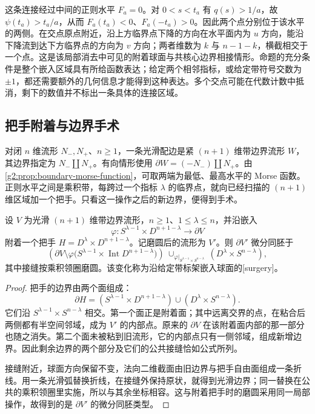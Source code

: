 \ProseParagraphBreak

这条连接经过中间的正则水平 \(F_a=0\)。对 \(0<s<t_a\) 有 \(q(s)>1/a\)，故 \(\psi(t_a)>t_a/a\)，从而 \(F_a(t_a)<0\)、\(F_a(-t_a)>0\)。因此两个点分别位于该水平的两侧。在交点原点附近，沿上方临界点下降的方向在水平面内为 \(u\) 方向，能沿下降流到达下方临界点的方向为 \(v\) 方向；两者维数为 \(k\) 与 \(n-1-k\)，横截相交于一个点。这是该局部消去中可见的附着球面与共核心边界相接情形。命题的充分条件是整个嵌入区域具有所给函数表达；给定两个相邻指标，或给定带符号交数为 \(\pm1\)，都还需要额外的几何信息才能得到这种表达。多个交点可能在代数计数中抵消，剩下的数值并不标出一条具体的连接区域。

\subsection{把手附着与边界手术}
\label{g2:subsec:1705:03}

对闭 \(n\) 维流形 \(N_-,N_+\)、\(n\ge1\)，一条光滑配边是紧 \((n+1)\) 维带边界流形 \(W\)，其边界指定为 \(N_-\amalg N_+\)。有向情形使用 \(\partial W=(-N_-)\amalg N_+\)。由\cref{g2:prop:boundary-morse-function}，可取两端为最低、最高水平的 Morse 函数。正则水平之间是乘积带，每跨过一个指标 \(\lambda\) 的临界点，就向已经扫描的 \((n+1)\) 维区域加一个把手。只看这一操作之后的新边界，便得到手术。

\begin{proposition}\label{g2:prop:handle-boundary-surgery}
	设 \(V\) 为光滑 \((n+1)\) 维带边界流形，\(n\ge1\)、\(1\le\lambda\le n\)，并沿嵌入
	\[
		\varphi:S^{\lambda-1}\times D^{n+1-\lambda}\longrightarrow\partial V
	\]
	附着一个把手 \(H=D^\lambda\times D^{n+1-\lambda}\)。记磨圆后的流形为 \(V'\)。则 \(\partial V'\) 微分同胚于
	\begin{equation}\label{g2:eq:handle-boundary-surgery}
		\left(\partial V\setminus\varphi\bigl(S^{\lambda-1}\times\operatorname{Int}D^{n+1-\lambda}\bigr)\right)
		\ \cup_{\varphi|_{S^{\lambda-1}\times S^{n-\lambda}}}\
		\left(D^\lambda\times S^{n-\lambda}\right),
	\end{equation}
	其中接缝按乘积领圈磨圆。该变化称为沿给定带标架嵌入球面的[surgery]。
\end{proposition}
\begin{proof}
	把手的边界由两个面组成：
	\[
		\partial H=
		\left(S^{\lambda-1}\times D^{n+1-\lambda}\right)
		\cup
		\left(D^\lambda\times S^{n-\lambda}\right).
	\]
	它们沿 \(S^{\lambda-1}\times S^{n-\lambda}\) 相交。第一个面正是附着面；其中远离交界的点，在粘合后两侧都有半空间邻域，成为 \(V'\) 的内部点。原来的 \(\partial V\) 在该附着面内部的那一部分也随之消失。第二个面未被粘到旧流形，它的内部点只有一侧邻域，组成新增边界。因此剩余边界的两个部分及它们的公共接缝恰如公式所列。

	接缝附近，球面方向保留不变，法向二维截面由旧边界与把手自由面组成一条折线。用一条光滑弧替换折线，在接缝外保持原状，就得到光滑边界；同一替换在公共的乘积领圈里实施，所以与其余坐标相容。这与附着把手时的磨圆采用同一局部操作，故得到的是 \(\partial V'\) 的微分同胚类型。
\end{proof}

